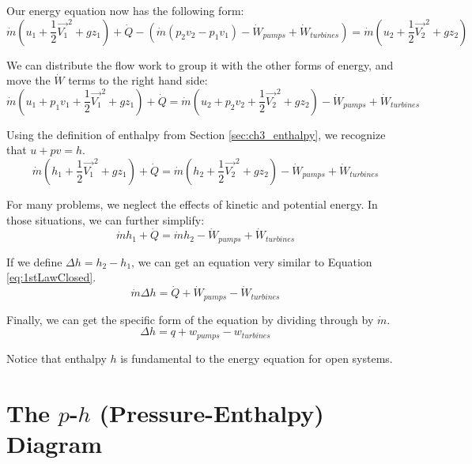 Our energy equation now has the following form:
\begin{equation*}
  \dot{m}\left(u_1 + \frac{1}{2}\vec{V_1}^2 + gz_1\right) + \dot{Q} - \left(\dot{m}(p_2 v_2 - p_1 v_1) -\dot{W}_{pumps} + \dot{W}_{turbines}\right)= \dot{m}\left(u_2 + \frac{1}{2}\vec{V_2}^2 + gz_2\right)
\end{equation*}

We can distribute the flow work to group it with the other forms of energy, and move the $\dot{W}$ terms to the right hand side:
\begin{equation*}
  \dot{m}\left(u_1 + p_1v_1 + \frac{1}{2}\vec{V_1}^2 + gz_1\right) + \dot{Q} = \dot{m}\left(u_2 + p_2v_2 + \frac{1}{2}\vec{V_2}^2 + gz_2\right) -\dot{W}_{pumps} + \dot{W}_{turbines}
\end{equation*}

Using the definition of enthalpy from Section \ref{sec:ch3_enthalpy}, we recognize that $u+pv = h$.
\begin{equation} \label{eq:controlVolumeEnergyEquation}
  \dot{m}\left(h_1 + \frac{1}{2}\vec{V_1}^2 + gz_1\right) + \dot{Q} = \dot{m}\left(h_2 + \frac{1}{2}\vec{V_2}^2 + gz_2\right) -\dot{W}_{pumps} + \dot{W}_{turbines}
\end{equation}

For many problems, we neglect the effects of kinetic and potential energy.  In those situations, we can further simplify:
\begin{equation*} 
  \dot{m}h_1 + \dot{Q} = \dot{m}h_2 -\dot{W}_{pumps} + \dot{W}_{turbines}
\end{equation*}

If we define $\Delta h = h_2 - h_1$, we can get an equation very similar to Equation \ref{eq:1stLawClosed}.
\begin{equation}
  \label{eq:controlVolumeEnergyNoKEPE}
  \dot{m} \Delta h = \dot{Q} + \dot{W}_{pumps} - \dot{W}_{turbines}
\end{equation}

Finally, we can get the specific form of the equation by dividing through by $\dot{m}$.
\begin{equation}\label{eq:ch4_firstLawOpenSystems}
  \Delta h = q + w_{pumps} - w_{turbines}
\end{equation}

Notice that enthalpy $h$ is fundamental to the energy equation for open systems.

\section{The $p$-$h$ (Pressure-Enthalpy) Diagram}

